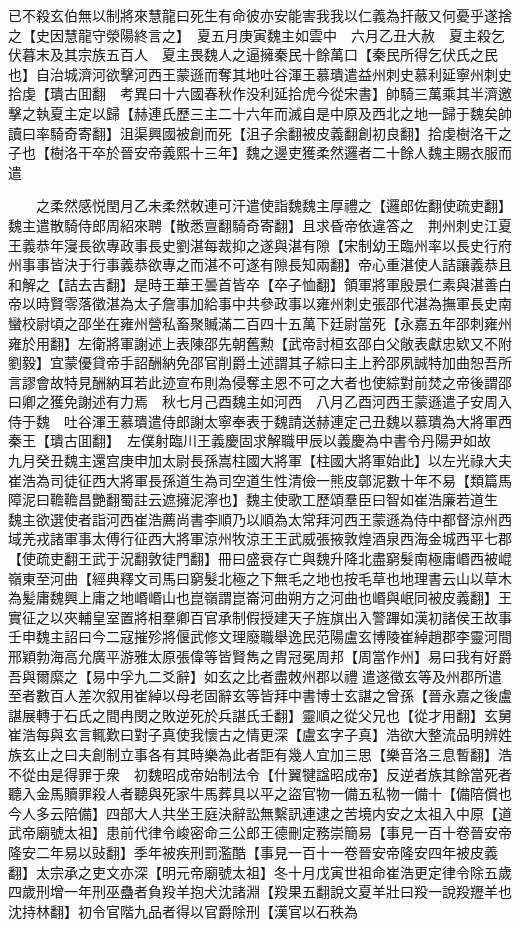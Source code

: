 已不殺玄伯無以制將來慧龍曰死生有命彼亦安能害我我以仁義為扞蔽又何憂乎遂捨之【史因慧龍守滎陽終言之】　夏五月庚寅魏主如雲中　六月乙丑大赦　夏主殺乞伏暮末及其宗族五百人　夏主畏魏人之逼擁秦民十餘萬口【秦民所得乞伏氏之民也】自治城濟河欲擊河西王蒙遜而奪其地吐谷渾王慕璝遣益州刺史慕利延寧州刺史拾虔【璝古囬翻　考異曰十六國春秋作没利延拾虎今從宋書】帥騎三萬乘其半濟邀擊之執夏主定以歸【赫連氏歷三主二十六年而滅自是中原及西北之地一歸于魏矣帥讀曰率騎奇寄翻】沮渠興國被創而死【沮子余翻被皮義翻創初良翻】拾虔樹洛干之子也【樹洛干卒於晉安帝義熙十三年】魏之邊吏獲柔然邏者二十餘人魏主賜衣服而遣

　　之柔然感悦閏月乙未柔然敇連可汗遣使詣魏魏主厚禮之【邏郎佐翻使疏吏翻】　魏主遣散騎侍郎周紹來聘【散悉亶翻騎奇寄翻】且求昏帝依違答之　荆州刺史江夏王義恭年寖長欲專政事長史劉湛每裁抑之遂與湛有隙【宋制幼王臨州率以長史行府州事事皆決于行事義恭欲專之而湛不可遂有隙長知兩翻】帝心重湛使人詰讓義恭且和解之【詰去吉翻】是時王華王曇首皆卒【卒子恤翻】領軍將軍殷景仁素與湛善白帝以時賢零落徵湛為太子詹事加給事中共參政事以雍州刺史張邵代湛為撫軍長史南蠻校尉頃之邵坐在雍州營私畜聚贓滿二百四十五萬下廷尉當死【永嘉五年邵刺雍州雍於用翻】左衛將軍謝述上表陳邵先朝舊勲【武帝討桓玄邵白父敞表獻忠欵又不附劉毅】宜蒙優貸帝手詔酬納免邵官削爵土述謂其子綜曰主上矜邵夙誠特加曲恕吾所言謬會故特見酬納耳若此迹宣布則為侵奪主恩不可之大者也使綜對前焚之帝後謂邵曰卿之獲免謝述有力焉　秋七月己酉魏主如河西　八月乙酉河西王蒙遜遣子安周入侍于魏　吐谷渾王慕璝遣侍郎謝太寧奉表于魏請送赫連定己丑魏以慕璝為大將軍西秦王【璝古囬翻】　左僕射臨川王義慶固求解職甲辰以義慶為中書令丹陽尹如故　九月癸丑魏主還宫庚申加太尉長孫嵩柱國大將軍【柱國大將軍始此】以左光祿大夫崔浩為司徒征西大將軍長孫道生為司空道生性清儉一熊皮鄣泥數十年不易【類篇馬障泥曰韂韂昌艷翻蜀註云遮擁泥濘也】魏主使歌工歷頌羣臣曰智如崔浩廉若道生　魏主欲選使者詣河西崔浩薦尚書李順乃以順為太常拜河西王蒙遜為侍中都督涼州西域羌戎諸軍事太傅行征西大將軍涼州牧涼王王武威張掖敦煌酒泉西海金城西平七郡【使疏吏翻王武于況翻敦徒門翻】冊曰盛衰存亡與魏升降北盡窮髮南極庸㟭西被崐嶺東至河曲【經典釋文司馬曰窮髮北極之下無毛之地也按毛草也地理書云山以草木為髪庸魏興上庸之地㟭㟭山也崑嶺謂崑崙河曲朔方之河曲也㟭與岷同被皮義翻】王實征之以夾輔皇室置將相羣卿百官承制假授建天子旌旗出入警蹕如漢初諸侯王故事　壬申魏主詔曰今二寇摧殄將偃武修文理廢職舉逸民范陽盧玄博陵崔綽趙郡李靈河間邢穎勃海高允廣平游雅太原張偉等皆賢雋之胄冠冕周邦【周當作州】易曰我有好爵吾與爾縻之【易中孚九二爻辭】如玄之比者盡敇州郡以禮遣遂徵玄等及州郡所遣至者數百人差次叙用崔綽以母老固辭玄等皆拜中書博士玄諶之曾孫【晉永嘉之後盧諶展轉于石氏之間冉閔之敗逆死於兵諶氏壬翻】靈順之從父兄也【從才用翻】玄舅崔浩每與玄言輒歎曰對子真使我懷古之情更深【盧玄字子真】浩欲大整流品明辨姓族玄止之曰夫創制立事各有其時樂為此者詎有幾人宜加三思【樂音洛三息暫翻】浩不從由是得罪于衆　初魏昭成帝始制法令【什翼犍諡昭成帝】反逆者族其餘當死者聽入金馬贖罪殺人者聽與死家牛馬葬具以平之盜官物一備五私物一備十【備陪償也今人多云陪備】四部大人共坐王庭決辭訟無繫訊連逮之苦境内安之太祖入中原【道武帝廟號太祖】患前代律令峻密命三公郎王德刪定務崇簡易【事見一百十卷晉安帝隆安二年易以䜴翻】季年被疾刑罰濫酷【事見一百十一卷晉安帝隆安四年被皮義翻】太宗承之吏文亦深【明元帝廟號太祖】冬十月戊寅世祖命崔浩更定律令除五歲四歲刑增一年刑巫蠱者負羖羊抱犬沈諸淵【羖果五翻說文夏羊壯曰羖一說羖䍽羊也沈持林翻】初令官階九品者得以官爵除刑【漢官以石秩為